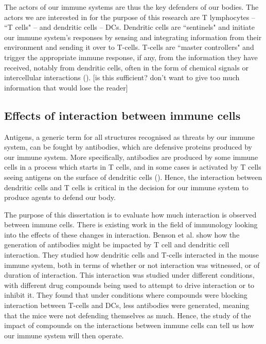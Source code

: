
The actors of our immune systems are thus the key defenders of our bodies. The actors we are interested in for the purpose of this research are T lymphocytes – ``T cells" – and dendritic cells – DCs. Dendritic cells are ``sentinels" and initiate our immune system's responses by sensing and integrating information from their environment and sending it over to T-cells. T-cells are ``master controllers" and trigger the appropriate immune response, if any, from the information they have received, notably from dendritic cells, often in the form of chemical signals or intercellular interactions (\cite{https://www.immunology.org/public-information/bitesized-immunology/cells/dendritic-cells, https://www.youtube.com/watch?v=hRvyCYyab68}). [is this sufficient? don't want to give too much information that would lose the reader]



\subsection{Effects of interaction between immune cells} \label{bg:interaction}

Antigens, a generic term for all structures recognised as threats by our immune system, can be fought by antibodies, which are defensive proteins produced by our immune system. More specifically, antibodies are produced by some immune cells in a process which starts in T cells, and in some cases is activated by T cells seeing antigens on the surface of dendritic cells (\cite{https://elifesciences.org/articles/06994}). Hence, the interaction between dendritic cells and T cells is critical in the decision for our immune system to produce agents to defend our body.

The purpose of this dissertation is to evaluate how much interaction is observed between immune cells. There is existing work in the field of immunology looking into the effects of these changes in interaction. Benson et al. show how the generation of antibodies might be impacted by T cell and dendritic cell interaction. They studied how dendritic cells and T-cells interacted in the mouse immune system, both in terms of whether or not interaction was witnessed, or of duration of interaction. This interaction was studied under different conditions, with different drug compounds being used to attempt to drive interaction or to inhibit it. They found that under conditions where compounds were blocking interaction between T-cells and DCs, less antibodies were generated, meaning that the mice were not defending themselves as much. Hence, the study of the impact of compounds on the interactions between immune cells can tell us how our immune system will then operate.


